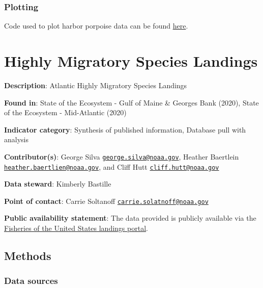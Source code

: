 \documentclass[
]{book}
\begin{document}
\hypertarget{plotting-11}{%
\subsection{Plotting}\label{plotting-11}}

Code used to plot harbor porpoise data can be found \href{https://github.com/NOAA-EDAB/tech-doc/tree/master/R/stored_scripts/hp_indicator_plotting.R}{here}.

\hypertarget{highly-migratory-species-landings}{%
\chapter{Highly Migratory Species Landings}\label{highly-migratory-species-landings}}

\textbf{Description}: Atlantic Highly Migratory Species Landings

\textbf{Found in}: State of the Ecosystem - Gulf of Maine \& Georges Bank (2020), State of the Ecosystem - Mid-Atlantic (2020)

\textbf{Indicator category}: Synthesis of published information, Database pull with analysis

\textbf{Contributor(s)}: George Silva \href{mailto:george.silva@noaa.gov}{\nolinkurl{george.silva@noaa.gov}}, Heather Baertlein \href{mailto:heather.baertlien@noaa.gov}{\nolinkurl{heather.baertlien@noaa.gov}}, and Cliff Hutt \href{mailto:cliff.hutt@noaa.gov}{\nolinkurl{cliff.hutt@noaa.gov}}

\textbf{Data steward}: Kimberly Bastille

\textbf{Point of contact}: Carrie Soltanoff \href{mailto:carrie.solatnoff@noaa.gov}{\nolinkurl{carrie.solatnoff@noaa.gov}}

\textbf{Public availability statement}: The data provided is publicly available via the \href{https://www.fisheries.noaa.gov/national/sustainable-fisheries/commercial-fisheries-landings}{Fisheries of the United States landings portal}.

\hypertarget{methods-19}{%
\section{Methods}\label{methods-19}}

\hypertarget{data-sources-19}{%
\subsection{Data sources}\label{data-sources-19}}
\end{document}
